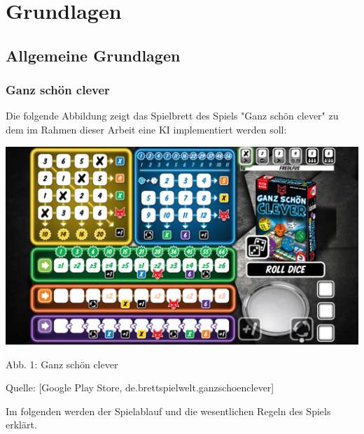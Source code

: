 \section{Grundlagen}
\subsection{Allgemeine Grundlagen}
\subsubsection{Ganz schön clever}
\begin{minipage}{\linewidth}
	Die folgende Abbildung zeigt das Spielbrett des Spiels "Ganz schön clever" zu dem im Rahmen dieser Arbeit eine KI implementiert werden soll:

	\vspace{0.5cm}
	\includegraphics[width=1\textwidth]{Bilder/gsc} 
	
	Abb. 1: Ganz schön clever 
	
	Quelle: [Google Play Store, de.brettspielwelt.ganzschoenclever]\\
\end{minipage}

Im folgenden werden der Spielablauf und die wesentlichen Regeln des Spiels erklärt.

